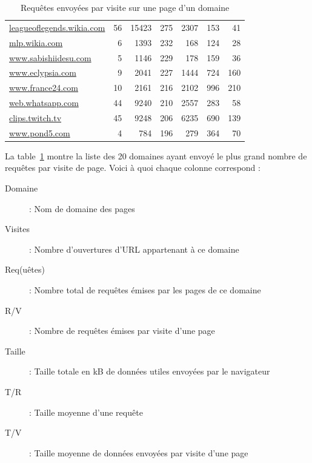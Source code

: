 \begin{table}[h]
\begin{tabular}{lrrrrrr}
\scriptsize \url{leagueoflegends.wikia.com} & 56             & 15423         & 275                            & 2307          & 153                     & 41                        \\
\scriptsize \url{mlp.wikia.com}             & 6              & 1393          & 232                            & 168           & 124                     & 28                        \\
\scriptsize \url{www.sabishiidesu.com}      & 5              & 1146          & 229                            & 178           & 159                     & 36                        \\
\scriptsize \url{www.eclypsia.com}          & 9              & 2041          & 227                            & 1444          & 724                     & 160                       \\
\scriptsize \url{www.france24.com}          & 10             & 2161          & 216                            & 2102          & 996                     & 210                       \\
\scriptsize \url{web.whatsapp.com}          & 44             & 9240          & 210                            & 2557          & 283                     & 58                        \\
\scriptsize \url{clips.twitch.tv}           & 45             & 9248          & 206                            & 6235          & 690                     & 139                       \\
\scriptsize \url{www.pond5.com}             & 4              & 784           & 196                            & 279           & 364                     & 70                        \\                     
\end{tabular}
\caption{Requêtes envoyées par visite sur une page d'un domaine}
\label{trackers-1}
\end{table}

			La table~\ref{trackers-1} montre la liste des 20 domaines ayant envoyé le plus grand nombre de requêtes par visite de page. Voici à quoi chaque colonne correspond :
			\begin{description}
				\item[Domaine] : Nom de domaine des pages
				\item[Visites] : Nombre d'ouvertures d'URL appartenant à ce domaine
				\item[Req(uêtes)] : Nombre total de requêtes émises par les pages de ce domaine
				\item[R/V] : Nombre de requêtes émises par visite d'une page
				\item[Taille] : Taille totale en kB de données utiles envoyées par le navigateur
				\item[T/R] : Taille moyenne d'une requête
				\item[T/V] : Taille moyenne de données envoyées par visite d'une page      
			\end{description}

